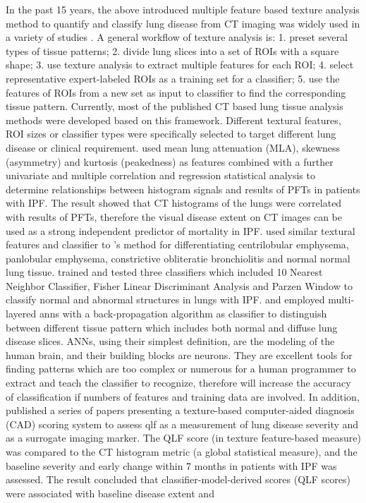 In the past 15 years, the above introduced multiple feature based texture analysis method to quantify and classify lung disease from CT imaging was widely used in a variety of studies \citep{van2002automatic,chabat2003obstructive,best2003quantitative,uchiyama2003quantitative,kim2005computer,zavaletta2006high,arzhaeva2007computer,best2008idiopathic,kim2010computer,kim2011quantitative,kim2015comparison}. A general workflow of texture analysis is: 1. preset several types of tissue patterns; 2. divide lung slices into a set of ROIs with a square shape; 3. use texture analysis to extract multiple features for each ROI; 4. select representative expert-labeled ROIs as a training set for a classifier; 5. use the features of ROIs from a new set as input to classifier to find the corresponding tissue pattern. Currently, most of the published CT based lung tissue analysis methods were developed based on this framework. Different textural features, ROI sizes or classifier types were specifically selected to target different lung disease or clinical requirement. \cite{best2003quantitative,best2008idiopathic} used mean lung attenuation (MLA), skewness (asymmetry) and kurtosis (peakedness) as features combined with a further univariate and multiple correlation and regression statistical analysis to determine relationships between histogram signals and results of PFTs in patients with IPF. The result showed that CT histograms of the lungs were correlated with results of PFTs, therefore the visual disease extent on CT images can be used as a strong independent predictor of mortality in IPF. \cite{chabat2003obstructive} used similar textural features and classifier to \cite{best2003quantitative,best2008idiopathic}'s method for differentiating centrilobular emphysema, panlobular emphysema, constrictive obliteratie bronchiolitis and normal normal lung tissue. \cite{zavaletta2007high} trained and tested three classifiers which included 10 Nearest Neighbor Classifier, Fisher Linear Discriminant Analysis and Parzen Window to classify normal and abnormal structures in lungs with IPF. \cite{uchiyama2003quantitative} and \cite{kim2005computer} employed multi-layered \gls{anns} with a back-propagation algorithm as classifier to distinguish between different tissue pattern which includes both normal and diffuse lung disease slices. ANNs, using their simplest definition, are the modeling of the human brain, and their building blocks are neurons. They are excellent tools for finding patterns which are too complex or numerous for a human programmer to extract and teach the classifier to recognize, therefore will increase the accuracy of classification if numbers of features and training data are involved. In addition, \cite{kim2010computer,kim2011quantitative,kim2015comparison} published a series of papers presenting a texture-based computer-aided diagnosis (CAD) scoring system to assess \gls{qlf} as a measurement of lung disease severity and as a surrogate imaging marker. The QLF score (in texture feature-based measure) was compared to the CT histogram metric (a global statistical measure), and the baseline severity and early change within 7 months in patients with IPF was assessed. The result concluded that classifier-model-derived scores (QLF scores) were associated with baseline disease extent and 